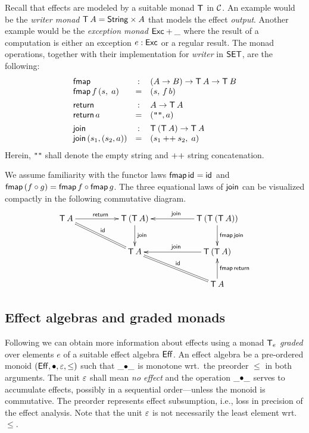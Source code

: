 \documentclass[acmsmall,review,anonymous]{acmart}\settopmatter{printfolios=true,printccs=false,printacmref=false}
\begin{document}
Recall that effects are modeled by a suitable monad $\T$ in
$\CC$.  An example would be the \emph{writer monad} $\T\,A = \String \times
A$ that models the effect \emph{output}.
Another example would be the \emph{exception monad} $\Exc + \_$ where
the result of a computation is either an exception $e : \Exc$ or a
regular result.
The monad operations, together with
their implementation for \emph{writer} in $\SET$, are the following:
\[
\begin{array}{lcl}
\tfmap & : & (A \to B) \to \T\,A \to \T\,B \\
\tfmap\, f\, (s,\; a) & = & (s,\, f\, b)
\\[1ex]
\treturn & : & A \to \T\,A \\
\treturn\, a & = & (\verb|""|, a)
\\[1ex]
\tjoin & : & \T\,(\T\,A) \to \T\,A \\
\tjoin\,(s_1,(s_2,a)) & = & (s_1 \append s_2,\; a) \\
\end{array}
\]
Herein, \verb|""| shall denote the empty string and $\append$ string
concatenation.

We assume familiarity with the functor laws $\tfmap\,\tid = \tid$ and
$\tfmap\,(f \circ g) = \tfmap\,f \circ \tfmap\,g$.
The three equational
laws of $\tjoin$ can be visualized compactly in the following
commutative diagram.
\[
\xymatrix@C=12ex{
  \T\,A     \ar[r]^{\treturn} \ar@{=}[dr]^{\tid}
& \T\,(\T\,A) \ar[d]^{\tjoin}
& \T\,(\T\,(\T\,A)) \ar[l]_{\tjoin} \ar[d]^{\tfmap\,\tjoin}
\\
& \T\,A       \ar@{=}[dr]^{\tid}
& \T\,(\T\,A) \ar[l]_{\tjoin}
\\
&
& \T\,A \ar[u]_{\tfmap\,\treturn}
}
\]

\subsection{Effect algebras and graded monads}
\label{sec:graded_monad}

Following \citet{katsumata:popl14}
we can obtain more information about effects using a monad $\T[e]$
\emph{graded} over elements $e$ of a suitable effect algebra $\Eff$.
An effect algebra be a pre-ordered monoid
$(\Eff,\bu,\Ge,\leq)$ such that $\_{\bu}\_$ is monotone wrt.\ the
preorder $\leq$ in both arguments.  The unit $\Ge$ shall mean \emph{no
  effect} and the operation $\_{\bu}\_$ serves to accumulate effects,
possibly in a sequential order---unless the monoid is commutative.  The
preorder represents effect subsumption, i.e., loss in precision of the
effect analysis.  Note that the unit $\Ge$ is not necessarily the least element
wrt.\ $\leq$.
\end{document}
